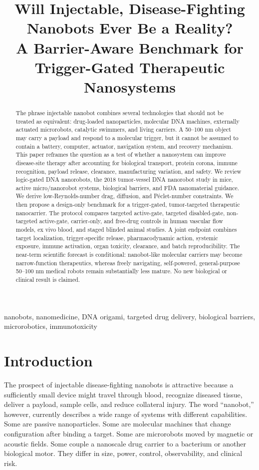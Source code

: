 \documentclass[conference]{IEEEtran}
\title{Will Injectable, Disease-Fighting Nanobots Ever Be a Reality?\\A Barrier-Aware Benchmark for Trigger-Gated Therapeutic Nanosystems}
\author{\IEEEauthorblockN{Research Design Report}\IEEEauthorblockA{Four-Agent Scientific Workflow: Survey--Idea--ExperimentDesign--Author}}
\begin{document}
\maketitle

\begin{abstract}
The phrase injectable nanobot combines several technologies that should not be treated as equivalent: drug-loaded nanoparticles, molecular DNA machines, externally actuated microrobots, catalytic swimmers, and living carriers. A 50--100 nm object may carry a payload and respond to a molecular trigger, but it cannot be assumed to contain a battery, computer, actuator, navigation system, and recovery mechanism. This paper reframes the question as a test of whether a nanosystem can improve disease-site therapy after accounting for biological transport, protein corona, immune recognition, payload release, clearance, manufacturing variation, and safety. We review logic-gated DNA nanorobots, the 2018 tumor-vessel DNA nanorobot study in mice, active micro/nanorobot systems, biological barriers, and FDA nanomaterial guidance. We derive low-Reynolds-number drag, diffusion, and Péclet-number constraints. We then propose a design-only benchmark for a trigger-gated, tumor-targeted therapeutic nanocarrier. The protocol compares targeted active-gate, targeted disabled-gate, non-targeted active-gate, carrier-only, and free-drug controls in human vascular flow models, ex vivo blood, and staged blinded animal studies. A joint endpoint combines target localization, trigger-specific release, pharmacodynamic action, systemic exposure, immune activation, organ toxicity, clearance, and batch reproducibility. The near-term scientific forecast is conditional: nanobot-like molecular carriers may become narrow-function therapeutics, whereas freely navigating, self-powered, general-purpose 50--100 nm medical robots remain substantially less mature. No new biological or clinical result is claimed.
\end{abstract}

\begin{IEEEkeywords}
nanobots, nanomedicine, DNA origami, targeted drug delivery, biological barriers, microrobotics, immunotoxicity
\end{IEEEkeywords}

\section{Introduction}
\label{sec:intro}
The prospect of injectable disease-fighting nanobots is attractive because a sufficiently small device might travel through blood, recognize diseased tissue, deliver a payload, sample cells, and reduce collateral injury. The word ``nanobot,'' however, currently describes a wide range of systems with different capabilities. Some are passive nanoparticles. Some are molecular machines that change configuration after binding a target. Some are microrobots moved by magnetic or acoustic fields. Some couple a nanoscale drug carrier to a bacterium or another biological motor. They differ in size, power, control, observability, and clinical risk.
\end{document}
